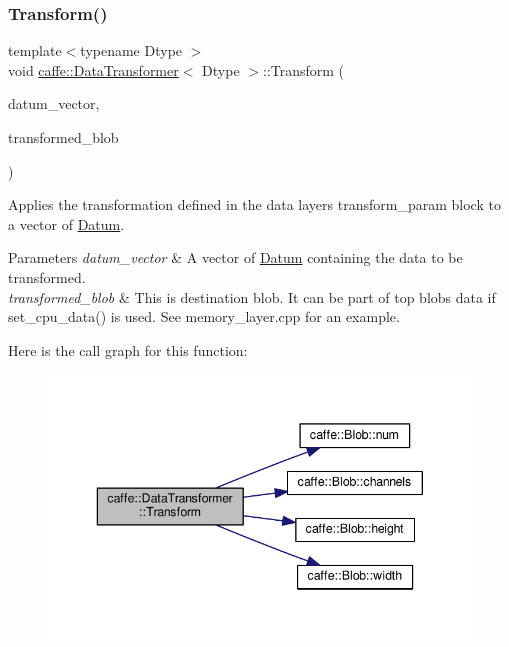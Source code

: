 \subsubsection{\texorpdfstring{Transform()}{Transform()}\hspace{0.1cm}{\footnotesize\ttfamily [4/6]}}
{\footnotesize\ttfamily template$<$typename Dtype $>$ \\
void \mbox{\hyperlink{classcaffe_1_1_data_transformer}{caffe\+::\+Data\+Transformer}}$<$ Dtype $>$\+::Transform (\begin{DoxyParamCaption}\item[{const vector$<$ \mbox{\hyperlink{classcaffe_1_1_datum}{Datum}} $>$ \&}]{datum\+\_\+vector,  }\item[{\mbox{\hyperlink{classcaffe_1_1_blob}{Blob}}$<$ Dtype $>$ $\ast$}]{transformed\+\_\+blob }\end{DoxyParamCaption})}



Applies the transformation defined in the data layer\textquotesingle{}s transform\+\_\+param block to a vector of \mbox{\hyperlink{classcaffe_1_1_datum}{Datum}}. 


\begin{DoxyParams}{Parameters}
{\em datum\+\_\+vector} & A vector of \mbox{\hyperlink{classcaffe_1_1_datum}{Datum}} containing the data to be transformed. \\
\hline
{\em transformed\+\_\+blob} & This is destination blob. It can be part of top blob\textquotesingle{}s data if set\+\_\+cpu\+\_\+data() is used. See memory\+\_\+layer.\+cpp for an example. \\
\hline
\end{DoxyParams}
Here is the call graph for this function\+:
\nopagebreak
\begin{figure}[H]
\begin{center}
\leavevmode
\includegraphics[width=343pt]{classcaffe_1_1_data_transformer_a082cad626c5f51c9f8d93bb88cca1bd0_cgraph}
\end{center}
\end{figure}
\mbox{\label{classcaffe_1_1_data_transformer_a168abf1bf9466420da6968178c6edb4d}} 

